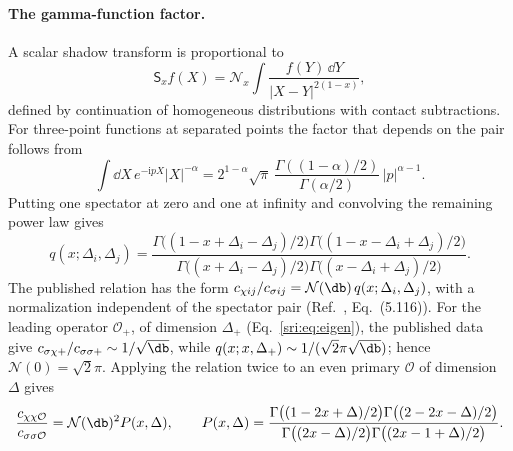 \paragraph{The gamma-function factor.} A scalar shadow transform is proportional to
\begin{equation}
 \mathsf S_xf(X)=\mathcal N_x\int\frac{f(Y)\,\dd Y}{|X-Y|^{2(1-x)}},
\end{equation}
defined by continuation of homogeneous distributions with contact subtractions. For three-point functions at separated
points the factor that depends on the pair follows from
\begin{equation}
 \int\dd X\,e^{-\mathrm ipX}|X|^{-\alpha}=2^{1-\alpha}\sqrt\pi\,\frac{\Gamma((1-\alpha)/2)}{\Gamma(\alpha/2)}\,|p|^{\alpha-1}.
\end{equation}
Putting one spectator at zero and one at infinity and convolving the remaining power law gives
\begin{equation}
 q(x;\Delta_i,\Delta_j)=\frac{\Gamma\bigl((1-x+\Delta_i-\Delta_j)/2\bigr)\Gamma\bigl((1-x-\Delta_i+\Delta_j)/2\bigr)}
 {\Gamma\bigl((x+\Delta_i-\Delta_j)/2\bigr)\Gamma\bigl((x-\Delta_i+\Delta_j)/2\bigr)}.
\end{equation}
The published relation has the form $c_{\chi ij}/c_{\sigma ij}=\mathcal N(\db)\,q(x;\Delta_i,\Delta_j)$, with a
normalization independent of the spectator pair (Ref.~\cite{sri:Benedetti:2025nzp}, Eq.~(5.116)). For the leading
operator $\mathcal O_+$, of dimension $\Delta_+$ (Eq.~\eqref{sri:eq:eigen}), the published data give
$c_{\sigma\chi+}/c_{\sigma\sigma+}\sim1/\sqrt{\db}$, while $q(x;x,\Delta_+)\sim1/(\sqrt2\pi\sqrt{\db})$; hence
$\mathcal N(0)=\sqrt2\pi$. Applying the relation twice to an even primary $\mathcal O$ of dimension $\Delta$ gives
\begin{equation}
 \frac{c_{\chi\chi\mathcal O}}{c_{\sigma\sigma\mathcal O}}=\mathcal N(\db)^2P(x,\Delta),\qquad
 P(x,\Delta)=\frac{\Gamma\bigl((1-2x+\Delta)/2\bigr)\Gamma\bigl((2-2x-\Delta)/2\bigr)}
 {\Gamma\bigl((2x-\Delta)/2\bigr)\Gamma\bigl((2x-1+\Delta)/2\bigr)}.
 \label{sri:eq:dualC:shadowP}
\end{equation}


